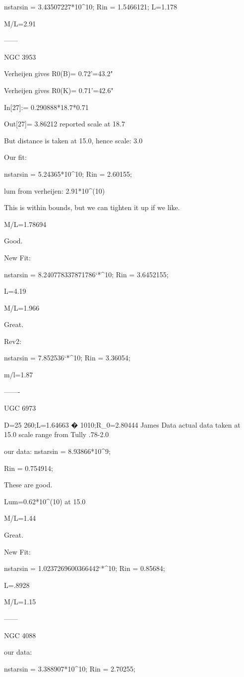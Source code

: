 nstarsin = 3.43507227*10^10;
Rin = 1.5466121;
L=1.178

M/L=2.91



------

NGC 3953

Verheijen gives R0(B)= 0.72'=43.2" 

Verheijen gives R0(K)= 0.71'=42.6"

In[27]:= 0.290888*18.7*0.71

Out[27]= 3.86212 reported scale at 18.7

But distance is taken at 15.0, hence scale: 3.0

Our fit:

nstarsin = 5.24365*10^10;
Rin = 2.60155;

lum from verheijen: 2.91*10^(10)


This is within bounds, but we can tighten it up if we like.

M/L=1.78694

Good.

New Fit:

nstarsin = 8.240778337871786`*^10;
Rin = 3.6452155;

L=4.19


M/L=1.966

Great.

Rev2:

nstarsin = 7.852536`*^10;
Rin = 3.36054;

m/l=1.87

-------

UGC 6973

D=25 260;L=1.64663 � 1010;R_0=2.80444 James Data
actual data taken at 15.0
scale range from Tully .78-2.0



our data:
nstarsin = 8.93866*10^9;

Rin = 0.754914;

These are good.

Lum=0.62*10^(10) at 15.0

M/L=1.44

Great.

New Fit:

nstarsin = 1.0237269600366442`*^10;
Rin = 0.85684;

L=.8928

M/L=1.15

------

NGC 4088

our data:

nstarsin = 3.388907*10^10;
Rin = 2.70255;

